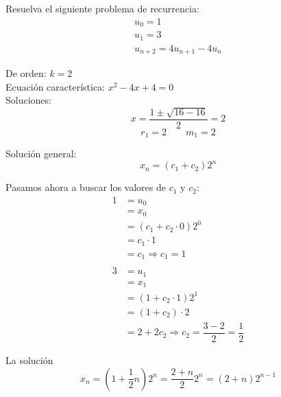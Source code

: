 \begin{ejercicio}
    Resuelva el siguiente problema de recurrencia:
    \begin{gather*}
        u_0 = 1 \\
        u_1 = 3 \\
        u_{n+2} = 4u_{n+1} - 4u_n
    \end{gather*}


    De orden: $k = 2$\\
    Ecuación característica: $x^2 -4x + 4 = 0$\\
    Soluciones: 
    \begin{equation*}
        x = \dfrac{1\pm \sqrt{16-16}}{2} = 2
    \end{equation*}
    \begin{equation*}
        r_1 = 2 \qquad m_1 = 2
    \end{equation*}

    Solución general:
    \begin{equation*}
        x_n = (c_1 + c_2) 2^n
    \end{equation*}


    Pasamos ahora a buscar los valores de $c_1$ y $c_2$:
    \begin{align*}
        1 &= u_0 \\
          &= x_0 \\
          &= (c_1+c_2 \cdot 0)2^0 \\
          &= c_1 \cdot 1  \\
          &= c_1 \Longrightarrow c_1 = 1\\
          & \\
        3 &= u_1 \\
          &= x_1 \\
          &= (1+c_2\cdot 1)2^1 \\
          &= (1+c_2)\cdot 2 \\
          &= 2 + 2 c_2 \Longrightarrow c_2 = \dfrac{3-2}{2} = \dfrac{1}{2}
    \end{align*}

    La solución
    \begin{equation*}
        x_n = \left(1 + \dfrac{1}{2}n\right) 2^n = \dfrac{2+n}{2} 2^n = (2+n)2^{n-1}
    \end{equation*}

\end{ejercicio}
